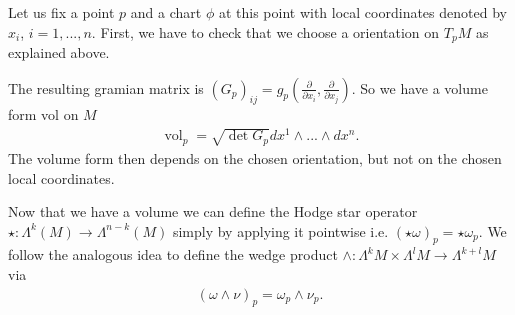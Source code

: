 \documentclass[12pt,a4paper]{article}
\numberwithin{equation}{subsection}
\numberwithin{lemma}{subsection}
\theoremstyle{definition}
\DeclareMathOperator{\vol}{vol}
\newcommand{\real}{\mathbb{R}}
\begin{document}
Let us fix a point $p$ and a chart $\phi$ 
at this point with local coordinates denoted by $x_i$, $i=1,...,n$. 
First, we have to check that we choose a orientation on $T_p M$ as explained 
above.

The resulting gramian matrix is
$(G_p)_{ij} = g_p(\frac{\partial}{\partial x_i},\frac{\partial}{\partial x_j})$.
So we have a volume form vol on $M$ 
\begin{align*}
    \vol_p = \sqrt{\det G_p} dx^1 \wedge ... \wedge dx^n.
\end{align*}
The volume form then depends on the chosen orientation, but not on the 
chosen local coordinates.



Now that we have a volume we can define the Hodge star operator
$\star: \Lambda^k(M) \rightarrow \Lambda^{n-k}(M)$ 
simply by applying it 
pointwise i.e. $(\star \omega)_p = \star \omega_p$. 
We follow the analogous idea to define the wedge product
$\wedge: \Lambda^k M \times \Lambda^l M \rightarrow \Lambda^{k+l} M$ via
\begin{align*}
    (\omega \wedge \nu )_p = \omega_p \wedge \nu_p. 
\end{align*} 
\end{document}
